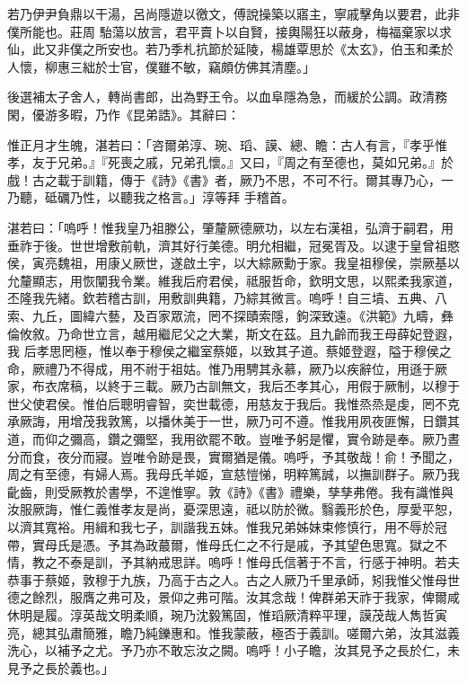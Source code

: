\begin{pinyinscope}
 若乃伊尹負鼎以干湯，呂尚隱遊以徼文，傅說操築以寤主，寧戚擊角以要君，此非僕所能也。莊周
 駘蕩以放言，君平賣卜以自賢，接輿陽狂以蔽身，梅福棄家以求仙，此又非僕之所安也。若乃季札抗節於延陵，楊雄覃思於《太玄》，伯玉和柔於人懷，柳惠三絀於士官，僕雖不敏，竊頗仿佛其清塵。」



 後選補太子舍人，轉尚書郎，出為野王令。以血阜隱為急，而緩於公調。政清務閑，優游多暇，乃作《昆弟誥》。其辭曰：



 惟正月才生魄，湛若曰：「咨爾弟淳、琬、瑫、謨、總、瞻：古人有言，『孝乎惟孝，友于兄弟。』『死喪之戚，兄弟孔懷。』又曰，『周之有至德也，莫如兄弟。』於戲！古之載于訓籍，傳于《詩》《書》者，厥乃不思，不可不行。爾其專乃心，一乃聽，砥礪乃性，以聽我之格言。」淳等拜
 手稽首。



 湛若曰：「嗚呼！惟我皇乃祖滕公，肇釐厥德厥功，以左右漢祖，弘濟于嗣君，用垂祚于後。世世增敷前軌，濟其好行美德。明允相繼，冠冕胥及。以逮于皇曾祖愍侯，寅亮魏祖，用康乂厥世，遂啟土宇，以大綜厥勳于家。我皇祖穆侯，崇厥基以允釐顯志，用恢闡我令業。維我后府君侯，祗服哲命，欽明文思，以熙柔我家道，丕隆我先緒。欽若稽古訓，用敷訓典籍，乃綜其微言。嗚呼！自三墳、五典、八索、九丘，圖緯六藝，及百家眾流，罔不探賾索隱，鉤深致遠。《洪範》九疇，彝倫攸敘。乃命世立言，越用繼尼父之大業，斯文在茲。且九齡而我王母薛妃登遐，我
 后孝思罔極，惟以奉于穆侯之繼室蔡姬，以致其子道。蔡姬登遐，隘于穆侯之命，厥禮乃不得成，用不祔于祖姑。惟乃用騁其永慕，厥乃以疾辭位，用遜于厥家，布衣席稿，以終于三載。厥乃古訓無文，我后丕孝其心，用假于厥制，以穆于世父使君侯。惟伯后聰明睿智，奕世載德，用慈友于我后。我惟烝烝是虔，罔不克承厥誨，用增茂我敦篤，以播休美于一世，厥乃可不遵。惟我用夙夜匪懈，日鑽其道，而仰之彌高，鑽之彌堅，我用欲罷不敢。豈唯予躬是懼，實令跡是奉。厥乃晝分而食，夜分而寢。豈唯令跡是畏，實爾猶是儀。嗚呼，予其敬哉！俞！予聞之，
 周之有至德，有婦人焉。我母氏羊姬，宣慈愷悌，明粹篤誠，以撫訓群子。厥乃我齔齒，則受厥教於書學，不遑惟寧。敦《詩》《書》禮樂，孳孳弗倦。我有識惟與汝服厥誨，惟仁義惟孝友是尚，憂深思遠，祗以防於微。翳義形於色，厚愛平恕，以濟其寬裕。用緝和我七子，訓諧我五妹。惟我兄弟姊妹束修慎行，用不辱於冠帶，實母氏是憑。予其為政蕞爾，惟母氏仁之不行是戚，予其望色思寬。獄之不情，教之不泰是訓，予其納戒思詳。嗚呼！惟母氏信著于不言，行感于神明。若夫恭事于蔡姬，敦穆于九族，乃高于古之人。古之人厥乃千里承師，矧我惟父惟母世
 德之餘烈，服膺之弗可及，景仰之弗可階。汝其念哉！俾群弟天祚于我家，俾爾咸休明是履。淳英哉文明柔順，琬乃沈毅篤固，惟瑫厥清粹平理，謨茂哉人雋哲寅亮，總其弘肅簡雅，瞻乃純鑠惠和。惟我蒙蔽，極否于義訓。嗟爾六弟，汝其滋義洗心，以補予之尤。予乃亦不敢忘汝之闕。嗚呼！小子瞻，汝其見予之長於仁，未見予之長於義也。」




\end{pinyinscope}
